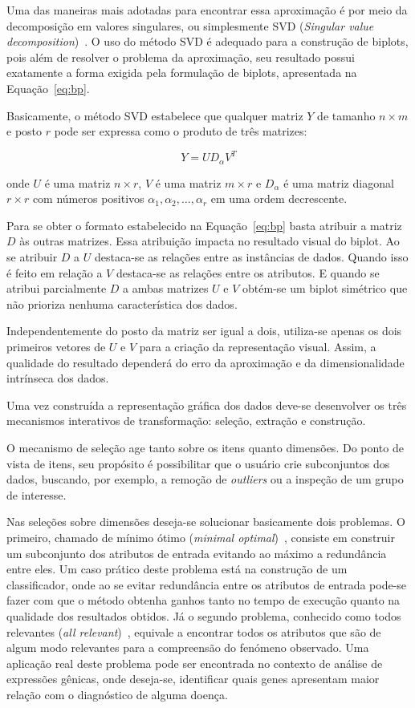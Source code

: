 Uma das maneiras mais adotadas para encontrar essa
aproximação é por meio da decomposição em valores
singulares, ou simplesmente SVD (\emph{Singular value
decomposition})~\cite{Kalman1996}. O uso do método SVD é
adequado para a construção de biplots, pois além de
resolver o problema da aproximação, seu resultado possui
exatamente a forma exigida pela formulação de biplots,
apresentada na Equação~\ref{eq:bp}.

Basicamente, o método SVD estabelece que qualquer matriz $Y$
de tamanho $n \times m$ e posto $r$ pode ser expressa como o
produto de três matrizes:

\begin{equation}
    Y = UD_{\alpha}V^T
\end{equation}

onde $U$ é uma matriz $n \times r$, $V$ é uma matriz $m
\times r$ e $D_\alpha$ é uma matriz diagonal $r \times r$
com números positivos $\alpha_1,\alpha_2,\ldots,\alpha_r$ em
uma ordem decrescente. 

Para se obter o formato estabelecido na Equação~\ref{eq:bp}
basta atribuir a matriz $D$ às outras matrizes. Essa
atribuição impacta no resultado visual do biplot. Ao se
atribuir $D$ a $U$ destaca-se as relações entre as
instâncias de dados. Quando isso é feito em relação a $V$
destaca-se as relações entre os atributos. E quando se
atribui parcialmente $D$ a ambas matrizes $U$ e $V$ obtém-se
um biplot simétrico que não prioriza nenhuma característica
dos dados.

Independentemente do posto da matriz ser igual a dois,
utiliza-se apenas os dois primeiros vetores de $U$ e $V$
para a criação da representação visual. Assim, a qualidade do
resultado dependerá do erro da aproximação e da
dimensionalidade intrínseca dos dados. 

Uma vez construída a representação gráfica dos dados deve-se
desenvolver os três mecanismos interativos de transformação:
seleção, extração e construção.

O mecanismo de seleção age tanto sobre os itens quanto
dimensões. Do ponto de vista de itens, seu propósito é
possibilitar que o usuário crie subconjuntos dos dados,
buscando, por exemplo, a remoção de \emph{outliers} ou a
inspeção de um grupo de interesse. 

Nas seleções sobre dimensões deseja-se solucionar
basicamente dois problemas. O primeiro, chamado de mínimo
ótimo (\emph{minimal optimal})~\cite{Kohavi1997}, consiste
em construir um subconjunto dos atributos de entrada
evitando ao máximo a redundância entre eles. Um caso prático
deste problema está na construção de um classificador,
onde ao se evitar redundância entre os atributos de entrada
pode-se fazer com que o método obtenha ganhos tanto no tempo de
execução quanto na qualidade dos resultados obtidos. Já o
segundo problema, conhecido como todos relevantes (\emph{all
relevant})~\cite{Nilsson2007}, equivale a encontrar todos os
atributos que são de algum modo relevantes para a
compreensão do fenómeno observado. Uma aplicação real deste
problema pode ser encontrada no contexto de análise
de expressões gênicas, onde deseja-se,
identificar quais genes apresentam maior relação com o
diagnóstico de alguma doença. 

